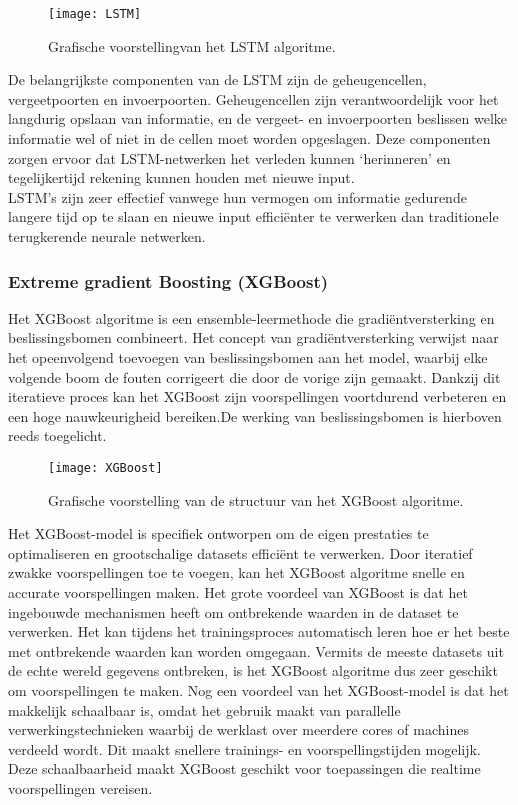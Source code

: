 \begin{figure}[h!]
    \centering\texttt{[image: LSTM]}
    \caption{\label{fig:LSTM}Grafische voorstellingvan het LSTM algoritme.}
\end{figure} 

De belangrijkste componenten van de LSTM zijn de geheugencellen, vergeetpoorten en invoerpoorten. Geheugencellen zijn verantwoordelijk voor het langdurig opslaan van informatie, en de vergeet- en invoerpoorten beslissen welke informatie wel of niet in de cellen moet worden opgeslagen. Deze componenten zorgen ervoor dat LSTM-netwerken het verleden kunnen ‘herinneren’ en tegelijkertijd rekening kunnen houden met nieuwe input. \\

LSTM's zijn zeer effectief vanwege hun vermogen om informatie gedurende langere tijd op te slaan en nieuwe input efficiënter te verwerken dan traditionele terugkerende neurale netwerken.

\subsubsection{Extreme gradient Boosting (XGBoost)}

Het XGBoost algoritme is een ensemble-leermethode die gradiëntversterking en beslissingsbomen combineert. Het concept van gradiëntversterking verwijst naar het opeenvolgend toevoegen van beslissingsbomen aan het model, waarbij elke volgende boom de fouten corrigeert die door de vorige zijn gemaakt. Dankzij dit iteratieve proces kan het XGBoost zijn voorspellingen voortdurend verbeteren en een hoge nauwkeurigheid bereiken.De werking van beslissingsbomen is hierboven reeds toegelicht. \\

\begin{figure}[h!]
    \centering\texttt{[image: XGBoost]}
    \caption{\label{fig:XGBoost}Grafische voorstelling van de structuur van het XGBoost algoritme.}
\end{figure} 

Het XGBoost-model is specifiek ontworpen om de eigen prestaties te optimaliseren en grootschalige datasets efficiënt te verwerken. Door iteratief zwakke voorspellingen toe te voegen, kan het XGBoost algoritme snelle en accurate voorspellingen maken. Het grote voordeel van XGBoost is dat het ingebouwde mechanismen heeft om ontbrekende waarden in de dataset te verwerken. Het kan tijdens het trainingsproces automatisch leren hoe er het beste met ontbrekende waarden kan worden omgegaan. Vermits de meeste datasets uit de echte wereld gegevens ontbreken, is het XGBoost algoritme dus zeer geschikt om voorspellingen te maken. Nog een voordeel van het XGBoost-model is dat het makkelijk schaalbaar is, omdat het gebruik maakt van parallelle verwerkingstechnieken waarbij de werklast over meerdere cores of machines verdeeld wordt. Dit maakt snellere trainings- en voorspellingstijden mogelijk. Deze schaalbaarheid maakt XGBoost geschikt voor toepassingen die realtime voorspellingen vereisen.

